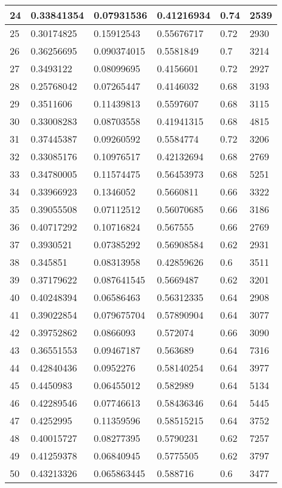 \begin{longtable}{|l|l|l|l|l|l|}
24 & 0.33841354 & 0.07931536 & 0.41216934 & 0.74 & 2539 \\ \hline 
25 & 0.30174825 & 0.15912543 & 0.55676717 & 0.72 & 2930 \\ \hline 
26 & 0.36256695 & 0.090374015 & 0.5581849 & 0.7 & 3214 \\ \hline 
27 & 0.3493122 & 0.08099695 & 0.4156601 & 0.72 & 2927 \\ \hline 
28 & 0.25768042 & 0.07265447 & 0.4146032 & 0.68 & 3193 \\ \hline 
29 & 0.3511606 & 0.11439813 & 0.5597607 & 0.68 & 3115 \\ \hline 
30 & 0.33008283 & 0.08703558 & 0.41941315 & 0.68 & 4815 \\ \hline 
31 & 0.37445387 & 0.09260592 & 0.5584774 & 0.72 & 3206 \\ \hline 
32 & 0.33085176 & 0.10976517 & 0.42132694 & 0.68 & 2769 \\ \hline 
33 & 0.34780005 & 0.11574475 & 0.56453973 & 0.68 & 5251 \\ \hline 
34 & 0.33966923 & 0.1346052 & 0.5660811 & 0.66 & 3322 \\ \hline 
35 & 0.39055508 & 0.07112512 & 0.56070685 & 0.66 & 3186 \\ \hline 
36 & 0.40717292 & 0.10716824 & 0.567555 & 0.66 & 2769 \\ \hline 
37 & 0.3930521 & 0.07385292 & 0.56908584 & 0.62 & 2931 \\ \hline 
38 & 0.345851 & 0.08313958 & 0.42859626 & 0.6 & 3511 \\ \hline 
39 & 0.37179622 & 0.087641545 & 0.5669487 & 0.62 & 3201 \\ \hline 
40 & 0.40248394 & 0.06586463 & 0.56312335 & 0.64 & 2908 \\ \hline 
41 & 0.39022854 & 0.079675704 & 0.57890904 & 0.64 & 3077 \\ \hline 
42 & 0.39752862 & 0.0866093 & 0.572074 & 0.66 & 3090 \\ \hline 
43 & 0.36551553 & 0.09467187 & 0.563689 & 0.64 & 7316 \\ \hline 
44 & 0.42840436 & 0.0952276 & 0.58140254 & 0.64 & 3977 \\ \hline 
45 & 0.4450983 & 0.06455012 & 0.582989 & 0.64 & 5134 \\ \hline 
46 & 0.42289546 & 0.07746613 & 0.58436346 & 0.64 & 5445 \\ \hline 
47 & 0.4252995 & 0.11359596 & 0.58515215 & 0.64 & 3752 \\ \hline 
48 & 0.40015727 & 0.08277395 & 0.5790231 & 0.62 & 7257 \\ \hline 
49 & 0.41259378 & 0.06840945 & 0.5775505 & 0.62 & 3797 \\ \hline 
50 & 0.43213326 & 0.065863445 & 0.588716 & 0.6 & 3477 \\ \hline 
\end{longtable}